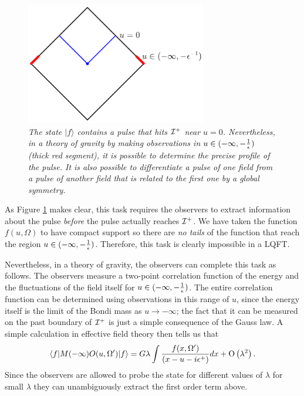 \documentclass[12pt]{article}
\def\gnewt{G}
\def\Or[#1]{{\text{O}}\left({#1}\right)}
\newcommand{\be}{\begin{equation}}
\newcommand{\ee}{\end{equation}}
\def \sph{{\Omega}}
\def \scrip{{\cal I}^{+}}
\begin{document}
\begin{figure}[!ht]
\begin{center}
\includegraphics[width=0.7\textwidth]{flatexc.pdf}
\caption{\em The state $|f \rangle$ contains a pulse that hits $\scrip$ near $u = 0$. Nevertheless, in a theory of gravity by making observations in $u \in (-\infty, -{1 \over \epsilon})$ (thick red segment), it is possible
to determine the precise profile of the pulse. It is also possible to differentiate a pulse of one field from a pulse of another field that is related to the first one by a global symmetry. \label{figpulse}}
\end{center}
\end{figure}
As Figure \ref{figpulse} makes clear, this task requires the observers to extract information about the pulse {\em before} the pulse actually reaches $\scrip$. We have taken the function $f(u, \Omega)$ to have compact support so there are {\em no tails} of the function that reach the region $u \in (-\infty, -{1 \over \epsilon})$. Therefore, this task is clearly impossible in a LQFT.

Nevertheless, in a theory of gravity, the observers can complete this task as follows. The observers measure a  two-point correlation function of the energy and the fluctuations of the field itself for $u \in (-\infty, -{1 \over \epsilon})$. The entire correlation function can be determined using observations in this range of $u$, since the energy itself is the limit of the Bondi mass as $u \rightarrow -\infty$;  the fact that it can be measured on the past boundary of $\scrip$ is just a simple consequence of the Gauss law. A simple calculation in effective field theory then tells us that
\be
\label{fresult}
\langle f | M(-\infty) O(u, \sph') | f \rangle =  \gnewt \lambda \int {f(x, \sph') \over (x - u - i \epsilon^{+})} d x + \Or[\lambda^2].
\ee
Since the observers are allowed to probe the state for different values of $\lambda$ for small $\lambda$ they can unambiguously extract the first order term above.
\end{document}
